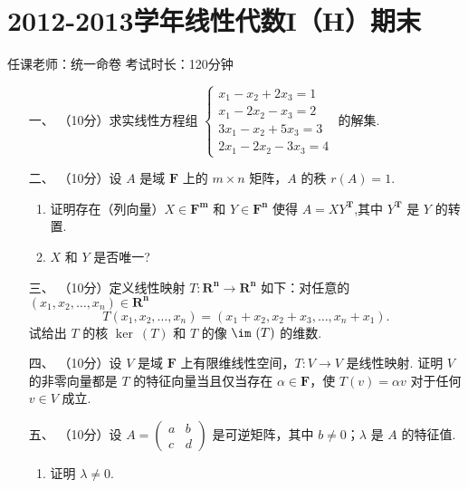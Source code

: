 \section*{2012-2013学年线性代数I（H）期末}

\begin{center}
    任课老师：统一命卷\hspace{4em} 考试时长：120分钟
\end{center}

\begin{enumerate}
    \item [一、]（10分）求实线性方程组 $\begin{cases}x_1-x_2+2x_3 = 1 \\ x_1-2x_2-x_3=2 \\ 3x_1-x_2+5x_3=3 \\ 2x_1-2x_2-3x_3 = 4\end{cases}$ 的解集.

    \item [二、]（10分）设 $A$ 是域 $\mathbf{F}$ 上的 $m\times n$ 矩阵，$A$ 的秩 $r(A)=1$.
    \begin{enumerate}[label=(\arabic*)]
        \item 证明存在（列向量）$X\in \mathbf{F^m}$ 和 $Y\in \mathbf{F^n}$ 使得 $A=XY^\mathbf{T}$,其中 $Y^\mathbf{T}$ 是 $Y$ 的转置.

        \item $X$ 和 $Y$ 是否唯一?
    \end{enumerate}

\item [三、]（10分）定义线性映射 $T:\mathbf{R^n} \to \mathbf{R^n}$ 如下：对任意的 $(x_1,x_2,\ldots,x_n) \in \mathbf{R^n}$
    \[T(x_1,x_2,\ldots,x_n)=(x_1+x_2,x_2+x_3,\ldots,x_n+x_1).\]
    试给出 $T$ 的核 $\ker \ (T)$ 和 $T$ 的像 $\im \ (T)$ 的维数.

    \item [四、]（10分）设 $V$ 是域 $\mathbf{F}$ 上有限维线性空间，$T:V\to V$ 是线性映射. 证明 $V$ 的非零向量都是 $T$ 的特征向量当且仅当存在 $\alpha \in \mathbf{F}$，使 $T(v)=\alpha v$ 对于任何 $v \in V$ 成立.

    \item [五、]（10分）设 $A=\begin{pmatrix}a & b \\ c & d\end{pmatrix}$ 是可逆矩阵，其中 $b\neq 0$；$\lambda$ 是 $A$ 的特征值.
    \begin{enumerate}[label=(\arabic*)]
        \item 证明 $\lambda \neq 0$.


\end{enumerate}
\end{enumerate}
